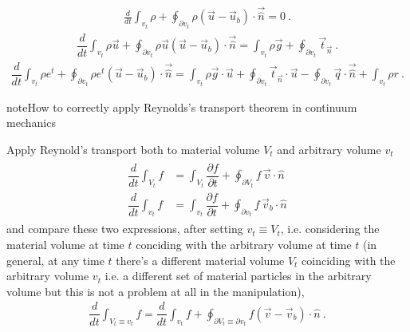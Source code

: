 \documentclass[letterpaper,10pt,english]{jupyterBook}
\begin{document}
\sphinxAtStartPar
{}
\begin{equation*}
\begin{split}\frac{d}{dt} \int_{v_t} \rho + \oint_{\partial v_t} \rho ( \vec{u} - \vec{u}_b ) \cdot \vec{\hat{n}} = 0 \ .\end{split}
\end{equation*}
\sphinxAtStartPar
{}
\begin{equation*}
\begin{split}\dfrac{d}{dt} \int_{v_t} \rho \vec{u} + \oint_{\partial v_t} \rho \vec{u} ( \vec{u} - \vec{u}_b ) \cdot \vec{\hat{n}} = \int_{v_t} \rho \vec{g} + \oint_{\partial v_t} \vec{t}_{\vec{n}} \ .\end{split}
\end{equation*}
\sphinxAtStartPar
{}
\begin{equation*}
\begin{split}\dfrac{d}{dt} \int_{v_t} \rho e^t + \oint_{\partial v_t} \rho e^t ( \vec{u} - \vec{u}_b ) \cdot \vec{\hat{n}} = \int_{v_t} \rho \vec{g} \cdot \vec{u} + \oint_{\partial v_t} \vec{t}_{\vec{n}} \cdot \vec{u} - \oint_{\partial v_t} \vec{q} \cdot \vec{\hat{n}} + \int_{v_t} \rho r \ .\end{split}
\end{equation*}
\begin{sphinxadmonition}{note}{How to correctly apply Reynolds’s transport theorem in continuum mechanics}

\sphinxAtStartPar
Apply Reynold’s transport both to material volume \(V_t\) and arbitrary volume \(v_t\)
\begin{equation*}
\begin{split}\begin{aligned}
  \dfrac{d}{d t} \int_{V_t} f & = \int_{V_t}\dfrac{\partial f}{\partial t} + \oint_{\partial V_t} f \, \vec{v}   \cdot \hat{n} \\
  \dfrac{d}{d t} \int_{v_t} f & = \int_{v_t}\dfrac{\partial f}{\partial t} + \oint_{\partial v_t} f \, \vec{v}_b \cdot \hat{n}   
\end{aligned}\end{split}
\end{equation*}
\sphinxAtStartPar
and compare these two expressions, after setting \(v_t \equiv V_t\), i.e. considering the material volume at time \(t\) conciding with the arbitrary volume at time \(t\) (in general, at any time \(t\) there’s a different material volume \(V_t\) coinciding with the arbitrary volume \(v_t\) \sphinxhyphen{} i.e. a different set of material particles in the arbitrary volume \sphinxhyphen{} but this is not a problem at all in the manipulation),
\begin{equation*}
\begin{split}\dfrac{d}{d t} \int_{V_t \equiv v_t} f = \dfrac{d}{d t} \int_{v_t} f + \oint_{\partial V_t \equiv \partial v_t} f (\vec{v} - \vec{v}_b) \cdot \hat{n} \ .\end{split}
\end{equation*}\end{sphinxadmonition}
\end{document}
